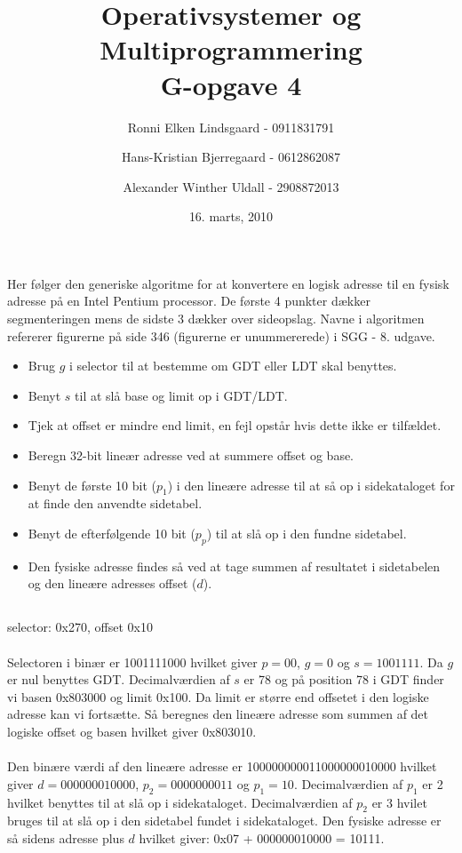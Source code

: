 \documentclass[titlepage]{article}
\title{Operativsystemer og Multiprogrammering\\G-opgave 4}
\author{Ronni Elken Lindsgaard - 0911831791 \and
Hans-Kristian Bjerregaard - 0612862087 \and
Alexander Winther Uldall - 2908872013}
\date{16. marts, 2010}
\begin{document}
\maketitle
\newpage

\section{}

\section{}
  Her følger den generiske algoritme for at konvertere en logisk adresse til en fysisk adresse på en Intel Pentium processor.
  De første 4 punkter dækker segmenteringen mens de sidste 3 dækker over sideopslag.
  Navne i algoritmen refererer figurerne på side 346 (figurerne er unummererede) i SGG - 8. udgave.
  \begin{itemize}
    \item Brug $g$ i selector til at bestemme om GDT eller LDT skal benyttes.
    \item Benyt $s$ til at slå base og limit op i GDT/LDT.
    \item Tjek at offset er mindre end limit, en fejl opstår hvis dette ikke er tilfældet.
    \item Beregn 32-bit lineær adresse ved at summere offset og base.
    \item Benyt de første 10 bit ($p_1$) i den lineære adresse til at så op i sidekataloget for at finde den anvendte sidetabel.
    \item Benyt de efterfølgende 10 bit ($p_p$) til at slå op i den fundne sidetabel.
    \item Den fysiske adresse findes så ved at tage summen af resultatet i sidetabelen og den lineære adresses offset ($d$).
  \end{itemize}
  
  \subsection{}
    selector: 0x270, offset 0x10
    \\\\
    Selectoren i binær er 1001111000 hvilket giver $p = 00$, $g = 0$ og $s = 1001111$.
    Da $g$ er nul benyttes GDT.
    Decimalværdien af $s$ er 78 og på position 78 i GDT finder vi basen 0x803000 og limit 0x100.
    Da limit er større end offsetet i den logiske adresse kan vi fortsætte.
    Så beregnes den lineære adresse som summen af det logiske offset og basen hvilket giver 0x803010.
    \\\\
    Den binære værdi af den lineære adresse er 100000000011000000010000 hvilket giver $d = 000000010000$, $p_2 = 0000000011$ og $p_1 = 10$.
    Decimalværdien af $p_1$ er 2 hvilket benyttes til at slå op i sidekataloget.
    Decimalværdien af $p_2$ er 3 hvilet bruges til at slå op i den sidetabel fundet i sidekataloget.
    Den fysiske adresse er så sidens adresse plus $d$ hvilket giver: 0x07 + 000000010000 = 10111.
    
\end{document}
